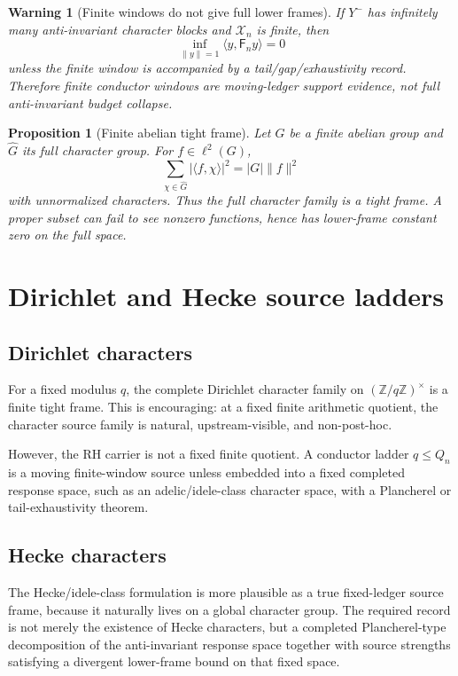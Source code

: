 \documentclass[11pt]{article}
\newtheorem{proposition}{Proposition}
\newtheorem{warning}{Warning}
\newcommand{\F}{\mathsf F}
\newcommand{\Y}{Y^-}
\newcommand{\Xn}{\mathcal X_n}
\begin{document}
\begin{warning}[Finite windows do not give full lower frames]
If \(\Y\) has infinitely many anti-invariant character blocks and \(\Xn\) is finite, then
\[
  \inf_{\|y\|=1}\langle y,\F_n y\rangle =0
\]
unless the finite window is accompanied by a tail/gap/exhaustivity record.  Therefore finite conductor windows are \emph{moving-ledger support evidence}, not full anti-invariant budget collapse.
\end{warning}

\begin{proposition}[Finite abelian tight frame]
Let \(G\) be a finite abelian group and \(\widehat G\) its full character group. For \(f\in\ell^2(G)\),
\begin{equation}
  \sum_{\chi\in\widehat G}|\langle f,\chi\rangle|^2 = |G|\|f\|^2
\end{equation}
with unnormalized characters. Thus the full character family is a tight frame. A proper subset can fail to see nonzero functions, hence has lower-frame constant zero on the full space.
\end{proposition}

\section{Dirichlet and Hecke source ladders}

\subsection{Dirichlet characters}
For a fixed modulus \(q\), the complete Dirichlet character family on \((\mathbb Z/q\mathbb Z)^\times\) is a finite tight frame. This is encouraging: at a fixed finite arithmetic quotient, the character source family is natural, upstream-visible, and non-post-hoc.

However, the RH carrier is not a fixed finite quotient. A conductor ladder \(q\le Q_n\) is a moving finite-window source unless embedded into a fixed completed response space, such as an adelic/idele-class character space, with a Plancherel or tail-exhaustivity theorem.

\subsection{Hecke characters}
The Hecke/idele-class formulation is more plausible as a true fixed-ledger source frame, because it naturally lives on a global character group. The required record is not merely the existence of Hecke characters, but a completed Plancherel-type decomposition of the anti-invariant response space together with source strengths satisfying a divergent lower-frame bound on that fixed space.
\end{document}
